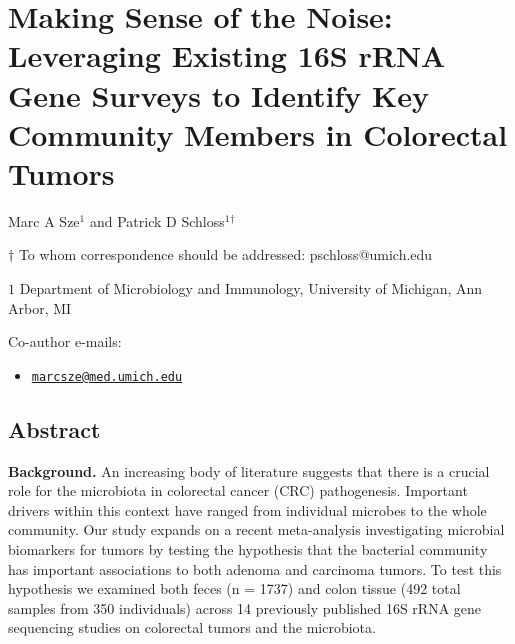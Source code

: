 \documentclass[12pt,]{article}
\title{}
\author{}
\date{}
\providecommand{\tightlist}{%
  \setlength{\itemsep}{0pt}\setlength{\parskip}{0pt}}
\begin{document}
\section{Making Sense of the Noise: Leveraging Existing 16S rRNA Gene
Surveys to Identify Key Community Members in Colorectal
Tumors}\label{making-sense-of-the-noise-leveraging-existing-16s-rrna-gene-surveys-to-identify-key-community-members-in-colorectal-tumors}

\begin{center}
\vspace{25mm}

Marc A Sze${^1}$ and Patrick D Schloss${^1}$${^\dagger}$

\vspace{20mm}

$\dagger$ To whom correspondence should be addressed: pschloss@umich.edu

$1$ Department of Microbiology and Immunology, University of Michigan, Ann Arbor, MI




\end{center}

Co-author e-mails:

\begin{itemize}
\tightlist
\item
  \href{mailto:marcsze@med.umich.edu}{\nolinkurl{marcsze@med.umich.edu}}
\end{itemize}

\newpage

\linenumbers

\subsection{Abstract}\label{abstract}

\textbf{Background.} An increasing body of literature suggests that
there is a crucial role for the microbiota in colorectal cancer (CRC)
pathogenesis. Important drivers within this context have ranged from
individual microbes to the whole community. Our study expands on a
recent meta-analysis investigating microbial biomarkers for tumors by
testing the hypothesis that the bacterial community has important
associations to both adenoma and carcinoma tumors. To test this
hypothesis we examined both feces (n = 1737) and colon tissue (492 total
samples from 350 individuals) across 14 previously published 16S rRNA
gene sequencing studies on colorectal tumors and the microbiota.
\end{document}
